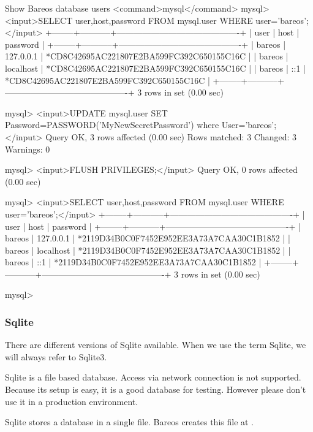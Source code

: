 \begin{commands}{Show Bareos database users}
<command>mysql</command>
mysql> <input>SELECT user,host,password FROM mysql.user WHERE user='bareos';</input>
+--------+-----------+-------------------------------------------+
| user   | host      | password                                  |
+--------+-----------+-------------------------------------------+
| bareos | 127.0.0.1 | *CD8C42695AC221807E2BA599FC392C650155C16C |
| bareos | localhost | *CD8C42695AC221807E2BA599FC392C650155C16C |
| bareos | ::1       | *CD8C42695AC221807E2BA599FC392C650155C16C |
+--------+-----------+-------------------------------------------+
3 rows in set (0.00 sec)

mysql> <input>UPDATE mysql.user SET Password=PASSWORD('MyNewSecretPassword') where User='bareos';</input>
Query OK, 3 rows affected (0.00 sec)
Rows matched: 3  Changed: 3  Warnings: 0

mysql> <input>FLUSH PRIVILEGES;</input>
Query OK, 0 rows affected (0.00 sec)

mysql> <input>SELECT user,host,password FROM mysql.user WHERE user='bareos';</input>
+--------+-----------+-------------------------------------------+
| user   | host      | password                                  |
+--------+-----------+-------------------------------------------+
| bareos | 127.0.0.1 | *2119D34B0C0F7452E952EE3A73A7CAA30C1B1852 |
| bareos | localhost | *2119D34B0C0F7452E952EE3A73A7CAA30C1B1852 |
| bareos | ::1       | *2119D34B0C0F7452E952EE3A73A7CAA30C1B1852 |
+--------+-----------+-------------------------------------------+
3 rows in set (0.00 sec)

mysql> 

\end{commands}



\subsubsection{Sqlite}

There are different versions of Sqlite available. When we use the term Sqlite, we will always refer to Sqlite3.

Sqlite is a file based database. Access via network connection is not supported.
Because its setup is easy, it is a good database for testing.
However please don't use it in a production environment.

Sqlite stores a database in a single file.
Bareos creates this file at .

